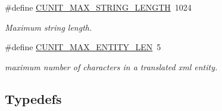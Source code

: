 \begin{DoxyCompactItemize}
\#define \hyperlink{group___framework_ga8c2ccf441412e1f4eda2fdc5cfcbf899}{C\+U\+N\+I\+T\+\_\+\+M\+A\+X\+\_\+\+S\+T\+R\+I\+N\+G\+\_\+\+L\+E\+N\+G\+T\+H}~1024
\begin{DoxyCompactList}\small\item\em Maximum string length. \end{DoxyCompactList}\item 
\#define \hyperlink{group___framework_ga089820634e54b8284d03d85e8b8e41a7}{C\+U\+N\+I\+T\+\_\+\+M\+A\+X\+\_\+\+E\+N\+T\+I\+T\+Y\+\_\+\+L\+E\+N}~5
\begin{DoxyCompactList}\small\item\em maximum number of characters in a translated xml entity. \end{DoxyCompactList}\end{DoxyCompactItemize}
\subsection*{Typedefs}
